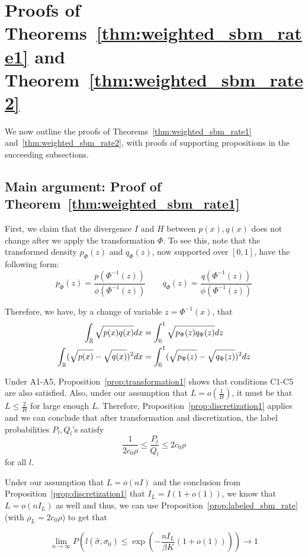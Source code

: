 \section{Proofs of Theorems~\ref{thm:weighted_sbm_rate1} and Theorem~\ref{thm:weighted_sbm_rate2}}
\label{sec:transformation_proof}

We now outline the proofs of Theorems~\ref{thm:weighted_sbm_rate1} and~\ref{thm:weighted_sbm_rate2}, with proofs of supporting propositions in the succeeding subsections.

\subsection{Main argument: Proof of Theorem~\ref{thm:weighted_sbm_rate1}}
\label{AppThmRate1}

First, we claim that the divergence $I$ and $H$ between $p(x), q(x)$ does not change after we apply the transformation $\Phi$. To see this, note that the transformed density $p_{\Phi}(z)$ and $q_{\Phi}(z)$, now supported over $[0,1]$, have the following form:
\[
p_{\Phi}(z) = \frac{p(\Phi^{-1}(z))}{\phi(\Phi^{-1}(z))} \qquad
q_{\Phi}(z) = \frac{q(\Phi^{-1}(z))}{\phi(\Phi^{-1}(z))}
\]

Therefore, we have, by a change of variable $z = \Phi^{-1}(x)$, that
\begin{align*}
\int_{\mathbb R} \sqrt{p(x) q(x)} dx &= \int_0^1 \sqrt{p_{\Phi}(z) q_{\Phi}(z)} dz \\
\int_{\mathbb R} (\sqrt{p(x)} - \sqrt{q(x)})^2 dx &= \int_0^1 (\sqrt{p_{\Phi}(z)} - \sqrt{ q_{\Phi}(z)})^2 dz 
\end{align*}

Under A1-A5, Proposition~\ref{prop:transformation1} shows that conditions C1-C5 are also satisfied. Also, under our assumption that $L = o(\frac{1}{H})$, it must be that $L \leq \frac{2}{H}$ for large enough $L$. Therefore, Proposition~\ref{prop:discretization1} applies and we can conclude that after transformation and discretization, the label probabilities $P_l, Q_l$'s satisfy 
\[
\frac{1}{2c_0 \rho} \leq \frac{P_l}{Q_l} \leq 2c_0 \rho
\]
for all $l$. 

Under our assumption that $L = o(nI)$ and the conclusion from Proposition~\ref{prop:discretization1} that $I_L = I (1 + o(1))$, we know that $L = o(n I_L)$ as well and thus, we can use Proposition~\ref{prop:labeled_sbm_rate} (with $\rho_L = 2 c_0 \rho$) to get that

\[
\lim_{n \rightarrow \infty} P \left( l(\hat{\sigma}, \sigma_0) \leq \exp \left( - \frac{ n I_L}{ \beta K} (1 + o(1)) \right) \right) \rightarrow 1
\]

